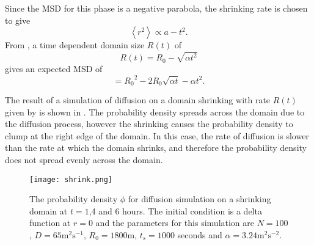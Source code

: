 Since the MSD for this phase is a negative parabola, the shrinking rate is chosen to give
%
 \begin{equation}
 \left<r^2\right> \propto a - t^2.
 \label{eqn:MSD_shrink}
 \end{equation}
%
From , a time dependent domain size $R(t)$ of
%
\begin{equation}
R(t) = R_0 - \sqrt{\alpha t^2}
\label{eqn:Rt}
\end{equation}
%
gives an expected MSD of
 \begin{equation}
 = {R_0}^2 - 2R_0\sqrt{\alpha t} -\alpha t^2.
 \end{equation}

The result of a simulation of diffusion on a domain shrinking with rate $R(t)$ given by  is shown in . The probability density spreads across the domain due to the diffusion process, however the shrinking causes the probability density to clump at the right edge of the domain. In this case, the rate of diffusion is slower than the rate at which the domain shrinks, and therefore the probability density does not spread evenly across the domain.
%
    \begin{figure} [h]
        \centering
            \texttt{[image: shrink.png]}
            \caption{The probability density $\phi$ for diffusion simulation on a shrinking domain at $t = 1$,4 and 6 hours. The initial condition is a delta function at $r = 0$ and the
             parameters for this simulation are $N = 100$, $D = 65\mathrm{m^2s^{-1}}$, $R_0 = 1800$m, $t_s = 1000$ seconds and $\alpha  = 3.24 \mathrm{m^2s^{-2}}$.}
        \label{fig:shrink_phi}
    \end{figure}
